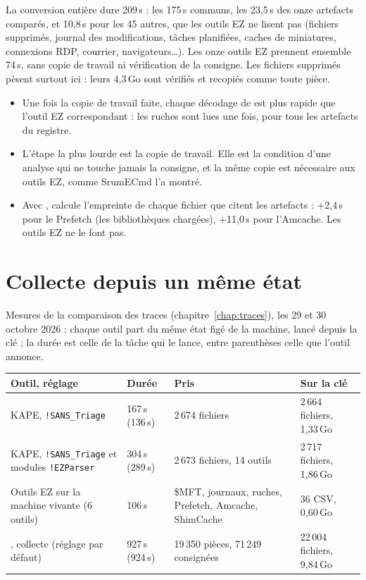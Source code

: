 \documentclass[11pt,a4paper,oneside]{report}
\begin{document}
La conversion entière dure 209\,s : les 175\,s communs, les 23,5\,s des onze
artefacts comparés, et 10,8\,s pour les 45 autres, que les outils EZ ne lisent
pas (fichiers supprimés, journal des modifications, tâches planifiées, caches
de miniatures, connexions RDP, courrier, navigateurs…). Les onze outils EZ
prennent ensemble 74\,s, sans copie de travail ni vérification de la
consigne. Les fichiers supprimés pèsent surtout ici : leurs 4,3\,Go sont
vérifiés et recopiés comme toute pièce.

\begin{itemize}
  \item Une fois la copie de travail faite, chaque décodage de \wac{} est plus
        rapide que l'outil EZ correspondant : les ruches sont lues une fois,
        pour tous les artefacts du registre.
  \item L'étape la plus lourde est la copie de travail. Elle est la condition
        d'une analyse qui ne touche jamais la consigne, et la même copie est
        nécessaire aux outils EZ, comme SrumECmd l'a montré.
  \item Avec , \wac{} calcule l'empreinte de chaque fichier que citent
        les artefacts : +2,4\,s pour le Prefetch (les bibliothèques chargées), +11,0\,s
        pour l'Amcache. Les outils EZ ne le font pas.
\end{itemize}

\section{Collecte depuis un même état}

Mesures de la comparaison des traces (chapitre~\ref{chap:traces}), les 29 et
30 octobre 2026 : chaque outil part du même état figé de la machine, lancé
depuis la clé ; la durée est celle de la tâche qui le lance, entre parenthèses
celle que l'outil annonce.

\begin{longtable}{@{}L{5.6cm}L{2.6cm}L{3.4cm}L{3.4cm}@{}}
\toprule
\textbf{Outil, réglage} & \textbf{Durée} & \textbf{Pris} & \textbf{Sur la clé} \\
\midrule\endhead
KAPE, \texttt{!SANS\_Triage} & 167\,s (136\,s) & 2\,674 fichiers & 2\,664 fichiers, 1,33\,Go \\
KAPE, \texttt{!SANS\_Triage} et modules \texttt{!EZParser} & 304\,s (289\,s) & 2\,673 fichiers, 14 outils & 2\,717 fichiers, 1,86\,Go \\
Outils EZ sur la machine vivante (6 outils) & 106\,s & \$MFT, journaux, ruches, Prefetch, Amcache, ShimCache & 36 CSV, 0,60\,Go \\
\wac{}, collecte (réglage par défaut) & 927\,s (924\,s) & 19\,350 pièces, 71\,249 consignées & 22\,004 fichiers, 9,84\,Go \\
\bottomrule
\end{longtable}
\end{document}

